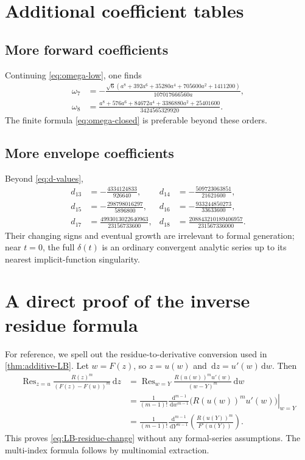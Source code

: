\documentclass[11pt]{article}
\numberwithin{equation}{section}
\theoremstyle{mainthm}
\theoremstyle{defstyle}
\theoremstyle{remark}
\newcommand{\dd}{\,\mathrm d}
\newcommand{\Res}{\operatorname{Res}}
\begin{document}
\appendix

\section{Additional coefficient tables}\label{app:tables}

\subsection{More forward coefficients}

Continuing \eqref{eq:omega-low}, one finds
\begin{align}
 \omega_7&=-\frac{\sqrt6\left(a^8+392a^6+35280a^4+705600a^2+1411200\right)}
 {107017666560a},\label{eq:omega7}\\
 \omega_8&=\frac{a^8+576a^6+84672a^4+3386880a^2+25401600}
 {3424565329920}.
 \label{eq:omega8}
\end{align}
The finite formula \eqref{eq:omega-closed} is preferable beyond these orders.

\subsection{More envelope coefficients}

Beyond \eqref{eq:d-values},
\begin{align}
 d_{13}&=-\frac{4334124833}{926640},&
 d_{14}&=-\frac{509723063851}{21621600},\nonumber\\
 d_{15}&=-\frac{298798016297}{5896800},&
 d_{16}&=-\frac{933244850273}{33633600},\label{eq:d13-d16}\\
 d_{17}&=\frac{4993013022640963}{23156733600},&
 d_{18}&=\frac{208843210189406957}{231567336000}.\nonumber
\end{align}
Their changing signs and eventual growth are irrelevant to formal generation; near \(t=0\), the full \(\delta(t)\) is an ordinary convergent analytic series up to its nearest implicit-function singularity.

\section{A direct proof of the inverse residue formula}\label{app:residue}

For reference, we spell out the residue-to-derivative conversion used in \cref{thm:additive-LB}.  Let \(w=F(z)\), so \(z=u(w)\) and \(\dd z=u'(w)\dd w\).  Then
\begin{align*}
 \Res_{z=u}\frac{R(z)^m}{(F(z)-F(u))^m}\dd z
 &=\Res_{w=Y}
 \frac{R(u(w))^mu'(w)}{(w-Y)^m}\dd w\\
 &=\frac1{(m-1)!}
 \left.\frac{\dd^{m-1}}{\dd w^{m-1}}
 \bigl(R(u(w))^mu'(w)\bigr)\right|_{w=Y}\\
 &=\frac1{(m-1)!}
 \frac{\dd^{m-1}}{\dd Y^{m-1}}
 \left(\frac{R(u(Y))^m}{F'(u(Y))}\right).
\end{align*}
This proves \eqref{eq:LB-residue-change} without any formal-series assumptions.  The multi-index formula follows by multinomial extraction.
\end{document}
